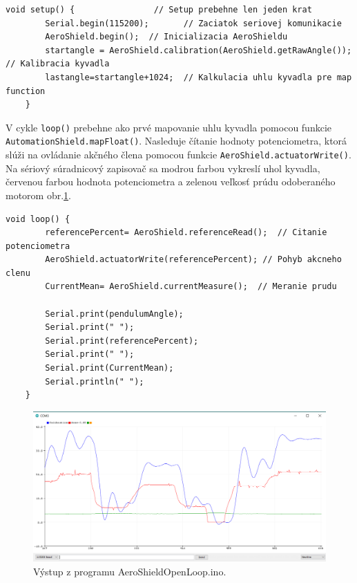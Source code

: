 \begin{lstlisting}[caption={AeroShield open loop setup().},captionpos=b]
	void setup() {                // Setup prebehne len jeden krat 
		Serial.begin(115200);       // Zaciatok seriovej komunikacie 
		AeroShield.begin();  // Inicializacia AeroShieldu 
		startangle = AeroShield.calibration(AeroShield.getRawAngle());   // Kalibracia kyvadla
		lastangle=startangle+1024;  // Kalkulacia uhlu kyvadla pre map function
	}
\end{lstlisting}

V cykle \verb|loop()| prebehne ako prvé mapovanie uhlu kyvadla pomocou funkcie \newline\verb|AutomationShield.mapFloat()|. Nasleduje čítanie hodnoty potenciometra, ktorá slúži na ovládanie akčného člena pomocou funkcie \verb|AeroShield.actuatorWrite()|. Na sériový súradnicový zapisovač sa modrou farbou vykreslí uhol kyvadla, červenou farbou hodnota potenciometra a zelenou veľkosť prúdu odoberaného motorom obr.\ref{OBRAZOK 3.1}. 

\begin{lstlisting}[caption={AeroShield open loop loop().},captionpos=b]
	void loop() {
		referencePercent= AeroShield.referenceRead();  // Citanie potenciometra
		AeroShield.actuatorWrite(referencePercent); // Pohyb akcneho clenu
		CurrentMean= AeroShield.currentMeasure();  // Meranie prudu
		
		Serial.print(pendulumAngle);    
		Serial.print(" ");
		Serial.print(referencePercent);  
		Serial.print(" ");
		Serial.print(CurrentMean);   
		Serial.println(" ");
	}
\end{lstlisting}

\begin{figure}[!tbh]
	\centering
	\includegraphics[width=120mm]{obr/VystupOLIDE.png}
	\caption{Výstup z programu AeroShieldOpenLoop.ino.}\label{OBRAZOK 3.1}
\end{figure}

